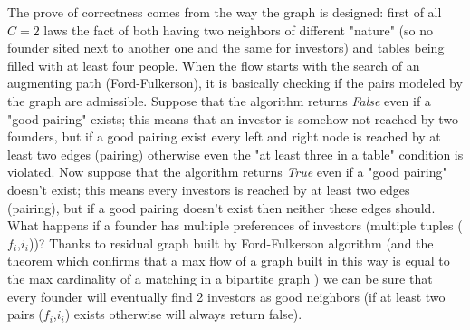 \documentclass[11pt]{scrartcl}
\begin{document}
The prove of correctness comes from the way the graph is designed: first of all $C=2$ laws the fact of both having two neighbors of different "nature" (so no founder sited next to another one and the same for investors) and tables being filled with at least four people. When the flow starts with the search of an augmenting path (Ford-Fulkerson), it is basically checking if the pairs modeled by the graph are admissible. Suppose that the algorithm returns \textit{False} even if a "good pairing" exists; this means that an investor is somehow not reached by two founders, but if a good pairing exist every left and right node is reached by at least two edges (pairing) otherwise even the "at least three in a table" condition is violated. Now suppose that the algorithm returns \textit{True} even if a "good pairing" doesn't exist; this means every investors is reached by at least two edges (pairing), but if a good pairing doesn't exist then neither these edges should. What happens if a founder has multiple preferences of investors (multiple tuples ($f_i$,$i_i$))? Thanks to residual graph  built by Ford-Fulkerson algorithm (and the theorem which confirms that a max flow of a graph built in this way is equal to the max cardinality of a matching in a bipartite graph ) we can be sure that every founder will eventually find 2 investors as good neighbors (if at least two pairs ($f_i$,$i_i$) exists otherwise will always return false).

\newpage
\end{document}
